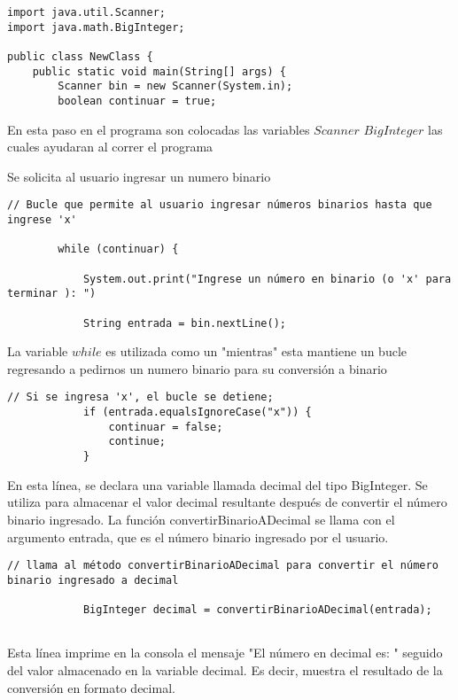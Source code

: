 \begin{lstlisting}[style=javaStyle]
import java.util.Scanner;
import java.math.BigInteger;

public class NewClass {
    public static void main(String[] args) {
        Scanner bin = new Scanner(System.in);
        boolean continuar = true;
\end{lstlisting}
En esta paso en el programa son colocadas las variables $Scanner$ $BigInteger$
las cuales ayudaran al correr el programa

Se solicita al usuario ingresar un numero binario
\begin{lstlisting}[style=javaStyle]
// Bucle que permite al usuario ingresar números binarios hasta que ingrese 'x'

        while (continuar) {
        
            System.out.print("Ingrese un número en binario (o 'x' para terminar ): ")
            
            String entrada = bin.nextLine();
\end{lstlisting}

 La variable $while$ es utilizada como un "mientras" esta mantiene un bucle regresando a pedirnos un numero binario para su conversión a binario

\begin{lstlisting}[style=javaStyle]
                 // Si se ingresa 'x', el bucle se detiene;
            if (entrada.equalsIgnoreCase("x")) {
                continuar = false;
                continue;
            }
\end{lstlisting}

En esta línea, se declara una variable llamada decimal del tipo BigInteger. Se utiliza para almacenar el valor decimal resultante después de convertir el número binario ingresado. La función convertirBinarioADecimal se llama con el argumento entrada, que es el número binario ingresado por el usuario.

\begin{lstlisting}[style=javaStyle]
 // llama al método convertirBinarioADecimal para convertir el número binario ingresado a decimal
 
            BigInteger decimal = convertirBinarioADecimal(entrada);
            
\end{lstlisting}

 Esta línea imprime en la consola el mensaje "El número en decimal es: " seguido del valor almacenado en la variable decimal. Es decir, muestra el resultado de la conversión en formato decimal.

